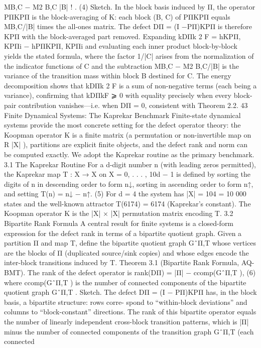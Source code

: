 MB,C −
M2
B,C
|B|
!
. (4)
Sketch. In the block basis induced by Π, the operator PΠKPΠ is the block-averaging of K: each
block (B, C) of PΠKPΠ equals MB,C/|B| times the all-ones matrix. The defect DΠ = (I −PΠ)KPΠ
is therefore KPΠ with the block-averaged part removed. Expanding kDΠk
2
F = hKPΠ, KPΠi −
hPΠKPΠ, KPΠi and evaluating each inner product block-by-block yields the stated formula, where
the factor 1/|C| arises from the normalization of the indicator functions of C and the subtraction
MB,C − M2
B,C/|B| is the variance of the transition mass within block B destined for C.
The energy decomposition shows that kDΠk
2
F
is a sum of non-negative terms (each being a
variance), confirming that kDΠkF ⩾ 0 with equality precisely when every block-pair contribution
vanishes—i.e. when DΠ = 0, consistent with Theorem 2.2.
43 Finite Dynamical Systems: The Kaprekar Benchmark
Finite-state dynamical systems provide the most concrete setting for the defect operator theory: the
Koopman operator K is a finite matrix (a permutation or non-invertible map on R
|X|
), partitions
are explicit finite objects, and the defect rank and norm can be computed exactly. We adopt the
Kaprekar routine as the primary benchmark.
3.1 The Kaprekar Routine
For a d-digit number n (with leading zeros permitted), the Kaprekar map T : X → X on X =
{0, . . . , 10d − 1} is defined by sorting the digits of n in descending order to form n↓, sorting in
ascending order to form n↑, and setting
T(n) = n↓ − n↑. (5)
For d = 4 the system has |X| = 104 = 10 000 states and the well-known attractor T(6174) = 6174
(Kaprekar’s constant). The Koopman operator K is the |X| × |X| permutation matrix encoding
T.
3.2 Bipartite Rank Formula
A central result for finite systems is a closed-form expression for the defect rank in terms of a
bipartite quotient graph. Given a partition Π and map T, define the bipartite quotient graph GˆΠ,T
whose vertices are the blocks of Π (duplicated source/sink copies) and whose edges encode the
inter-block transitions induced by T.
Theorem 3.1 (Bipartite Rank Formula, AQ-BMT). The rank of the defect operator is
rank(DΠ) = |Π| − ccomp(GˆΠ,T ), (6)
where ccomp(GˆΠ,T ) is the number of connected components of the bipartite quotient graph GˆΠ,T .
Sketch. The defect DΠ = (I − PΠ)KPΠ has, in the block basis, a bipartite structure: rows corre-
spond to “within-block deviations” and columns to “block-constant” directions. The rank of this
bipartite operator equals the number of linearly independent cross-block transition patterns, which
is |Π| minus the number of connected components of the transition graph GˆΠ,T (each connected
